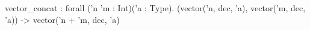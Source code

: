 vector_concat : forall ('n 'm : Int)('a : Type). (vector('n, dec, 'a), vector('m, dec, 'a)) -> vector('n + 'm, dec, 'a)